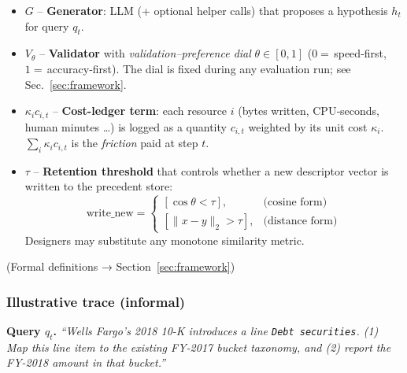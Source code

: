 \documentclass[11pt]{article}
\begin{document}
\begin{tcolorbox}[colback=black!3,colframe=black!40,
  boxrule=0.4pt, arc=2pt, left=2pt, right=2pt,
  top=4pt, bottom=4pt, title=Notation snapshot]
\small
\begin{itemize}[leftmargin=*]
\item $G$ – \textbf{Generator}: LLM (+ optional helper calls)
that proposes a hypothesis $h_t$ for query $q_t$.
\item $V_{\theta}$ – \textbf{Validator} with
\emph{validation–preference dial} $\theta\!\in[0,1]$  
($0 =\,$speed‐first, $1 =\,$accuracy‐first).  
The dial is fixed during any evaluation run; see
Sec.~\ref{sec:framework}.
\item $\kappa_i c_{i,t}$ – \textbf{Cost-ledger term}: each resource $i$
(bytes written, CPU‐seconds, human minutes …) is logged as a
quantity $c_{i,t}$ weighted by its unit cost $\kappa_i$.
$\sum_i\kappa_i c_{i,t}$ is the \emph{friction} paid at step $t$.
\item $\tau$ – \textbf{Retention threshold} that controls whether a
new descriptor vector is written to the precedent store:  
\vspace{-2pt}
\[
\text{write\_new}=\begin{cases}
[\cos\theta < \tau], &\text{(cosine form)}\\[4pt]
[\lVert x-y\rVert_2 > \tau], &\text{(distance form)}
\end{cases}
\]
Designers may substitute any monotone similarity metric.
\end{itemize}
\vspace{2pt}\par\footnotesize (Formal definitions → Section~\ref{sec:framework})\par
\end{tcolorbox}



\FloatBarrier



\vspace{1em}
\subsubsection*{Illustrative trace (informal)}

\noindent
\textbf{Query $q_t$.}  
\emph{``Wells Fargo's 2018 10-K introduces a line
\texttt{Debt securities}.  
(1) Map this line item to the existing FY-2017 bucket taxonomy, and  
(2) report the FY-2018 amount in that bucket.''}
\end{document}

